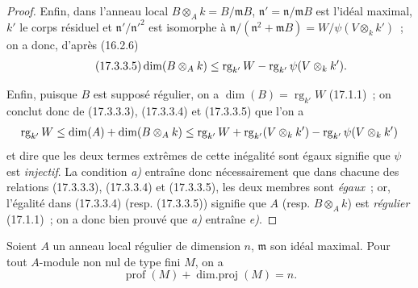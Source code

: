 \begin{proof}
Enfin, dans l'anneau local $B\otimes_A k=B/\mathfrak{m}B$,
$\mathfrak{n}'=\mathfrak{n}/\mathfrak{m}B$ est l'idéal maximal, $k'$ le corps
résiduel et $\mathfrak{n}'/\mathfrak{n}'^2$ est isomorphe à
$\mathfrak{n}/(\mathfrak{n}^2+\mathfrak{m}B)
=W/\psi(V\otimes_k k')$~; on a donc, d'après (16.2.6)
\begin{equation}
\label{0.17.3.3.5-fr}
\tag{17.3.3.5}
  \dim(B\otimes_A k)
  \leq\operatorname{rg}_{k'}W
  -\operatorname{rg}_{k'}\psi(V\otimes_k k').
\end{equation}

Enfin, puisque $B$ est supposé régulier, on a
$\dim(B)=\operatorname{rg}_{k'}W$ (17.1.1)~; on conclut donc de (17.3.3.3),
(17.3.3.4) et (17.3.3.5) que l'on a
\[
  \operatorname{rg}_{k'}W
  \leq\dim(A)+\dim(B\otimes_A k)
  \leq\operatorname{rg}_{k'}W
  +\operatorname{rg}_{k'}(V\otimes_k k')
  -\operatorname{rg}_{k'}\psi(V\otimes_k k')
\]
et dire que les deux termes extrêmes de cette inégalité sont égaux signifie
que $\psi$ est \emph{injectif}. La condition \emph{a)} entraîne donc nécessairement
que dans chacune des relations (17.3.3.3), (17.3.3.4) et (17.3.3.5), les deux
membres sont \emph{égaux}~; or, l'égalité dans (17.3.3.4) (resp. (17.3.3.5))
signifie que $A$ (resp. $B\otimes_A k$) est \emph{régulier} (17.1.1)~; on a
donc bien prouvé que \emph{a)} entraîne \emph{e)}.
\end{proof}

\begin{proposition}[17.3.4]
\label{0.17.3.4-fr}
Soient $A$ un anneau local régulier de dimension $n$, $\mathfrak{m}$ son idéal
maximal. Pour tout $A$-module non nul de type fini $M$, on a
\begin{equation}
\label{0.17.3.4.1-fr}
\tag{17.3.4.1}
  \operatorname{prof}(M)+\operatorname{dim.proj}(M)=n.
\end{equation}
\end{proposition}

